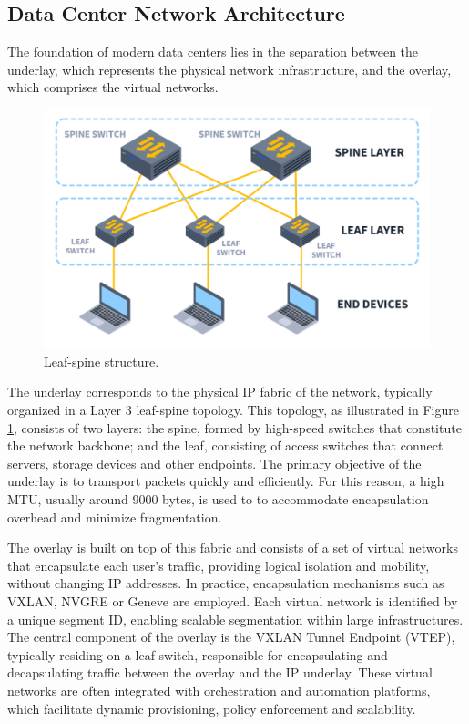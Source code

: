 \subsection{Data Center Network Architecture}
The foundation of modern data centers lies in the separation between the underlay, which represents the physical network infrastructure, and the overlay, which comprises the virtual networks. 

\begin{figure}
    \centering
    \vspace{-5pt}
    \includegraphics[width=0.9\linewidth]{Figures/LeafSpine.png}
    \caption{Leaf-spine structure. \cite{leafspine}}
    \label{leafSpine}
    \vspace{-10pt}
\end{figure}

The underlay corresponds to the physical IP fabric of the network, typically organized in a Layer 3 leaf-spine topology. This topology, as illustrated in Figure \ref{leafSpine}, consists of two layers: the spine, formed by high-speed switches that constitute the network backbone; and the leaf, consisting of access switches that connect servers, storage devices and other endpoints. The primary objective of the underlay is to transport packets quickly and efficiently. For this reason, a high MTU, usually around 9000 bytes, is used to to accommodate encapsulation overhead and minimize fragmentation. 

The overlay is built on top of this fabric and consists of a set of virtual networks that encapsulate each user's traffic, providing logical isolation and mobility, without changing IP addresses. In practice, encapsulation mechanisms such as VXLAN, NVGRE or Geneve are employed. Each virtual network is identified by a unique segment ID, enabling scalable segmentation within large infrastructures. The central component of the overlay is the VXLAN Tunnel Endpoint (VTEP), typically residing on a leaf switch, responsible for encapsulating and decapsulating traffic between the overlay and the IP underlay. These virtual networks are often integrated with orchestration and automation platforms, which facilitate dynamic provisioning, policy enforcement and scalability. 

